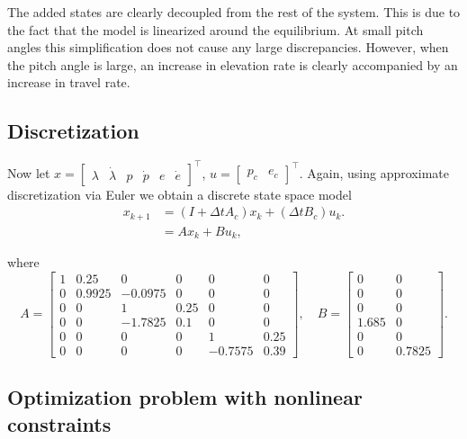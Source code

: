 The added states are clearly decoupled from the rest of the system. This is due to the fact that the model is linearized around the equilibrium. At small pitch angles this simplification does not cause any large discrepancies. However, when the pitch angle is large, an increase in elevation rate is clearly accompanied by an increase in travel rate. 

\subsection{Discretization}
Now let $x = \begin{bmatrix}\lambda&\dot{\lambda}&p&\dot{p}&e&\dot{e}\end{bmatrix}^\top$, $u = \begin{bmatrix}p_c&e_c\end{bmatrix}^\top$. Again, using approximate discretization via Euler we obtain a discrete state space model
\begin{subequations}
\begin{align}
	\label{eq:ex_dsys}
	x_{k+1} &= (I + \Delta t A_c) x_k + (\Delta t B_c) u_k. \\
	&= Ax_k + Bu_k,
\end{align}
\end{subequations}

where 
\begin{equation*}
	A = 
	\begin{bmatrix}
		1 & 0.25 & 0 & 0 & 0 & 0\\
		0 & 0.9925 & -0.0975 & 0 & 0 & 0\\
		0 & 0 & 1 & 0.25 & 0 & 0\\
		0 & 0 & -1.7825 & 0.1 & 0 & 0\\
		0 & 0 & 0 & 0 & 1 & 0.25\\
		0 & 0 & 0 & 0 & -0.7575 & 0.39
	\end{bmatrix}, \quad
	B = 
	\begin{bmatrix}
		0 & 0\\
		0 & 0\\
		0 & 0\\
		1.685 & 0\\
		0 & 0\\
		0 & 0.7825
	\end{bmatrix}.
\end{equation*}

\subsection{Optimization problem with nonlinear constraints}

